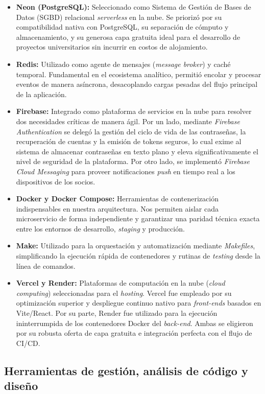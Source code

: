 \begin{itemize}
    \item \textbf{Neon (PostgreSQL):} Seleccionado como Sistema de Gestión de Bases de Datos (SGBD) relacional \textit{serverless} en la nube. Se priorizó por su compatibilidad nativa con PostgreSQL, su separación de cómputo y almacenamiento, y su generosa capa gratuita ideal para el desarrollo de proyectos universitarios sin incurrir en costos de alojamiento.
    \item \textbf{Redis:} Utilizado como agente de mensajes (\textit{message broker}) y caché temporal. Fundamental en el ecosistema analítico, permitió encolar y procesar eventos de manera asíncrona, desacoplando cargas pesadas del flujo principal de la aplicación.
    \item \textbf{Firebase:} Integrado como plataforma de servicios en la nube para resolver dos necesidades críticas de manera ágil. Por un lado, mediante \textit{Firebase Authentication} se delegó la gestión del ciclo de vida de las contraseñas, la recuperación de cuentas y la emisión de tokens seguros, lo cual exime al sistema de almacenar contraseñas en texto plano y eleva significativamente el nivel de seguridad de la plataforma. Por otro lado, se implementó \textit{Firebase Cloud Messaging} para proveer notificaciones \textit{push} en tiempo real a los dispositivos de los socios.
    \item \textbf{Docker y Docker Compose:} Herramientas de contenerización indispensables en nuestra arquitectura. Nos permiten aislar cada microservicio de forma independiente y garantizar una paridad técnica exacta entre los entornos de desarrollo, \textit{staging} y producción.
    \item \textbf{Make:} Utilizado para la orquestación y automatización mediante \textit{Makefiles}, simplificando la ejecución rápida de contenedores y rutinas de \textit{testing} desde la línea de comandos.
    \item \textbf{Vercel y Render:} Plataformas de computación en la nube (\textit{cloud computing}) seleccionadas para el \textit{hosting}. Vercel fue empleado por su optimización superior y despliegue continuo nativo para \textit{front-ends} basados en Vite/React. Por su parte, Render fue utilizado para la ejecución ininterrumpida de los contenedores Docker del \textit{back-end}. Ambas se eligieron por su robusta oferta de capa gratuita e integración perfecta con el flujo de CI/CD.
\end{itemize}

\subsection{Herramientas de gestión, análisis de código y diseño}

